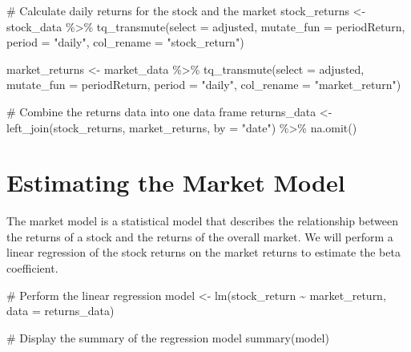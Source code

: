 \documentclass[
]{scrartcl}
\newenvironment{Shaded}{\begin{snugshade}}{\end{snugshade}}
\newcommand{\AttributeTok}[1]{\textcolor[rgb]{0.40,0.45,0.13}{#1}}
\newcommand{\CommentTok}[1]{\textcolor[rgb]{0.37,0.37,0.37}{#1}}
\newcommand{\FunctionTok}[1]{\textcolor[rgb]{0.28,0.35,0.67}{#1}}
\newcommand{\NormalTok}[1]{\textcolor[rgb]{0.00,0.23,0.31}{#1}}
\newcommand{\OtherTok}[1]{\textcolor[rgb]{0.00,0.23,0.31}{#1}}
\newcommand{\SpecialCharTok}[1]{\textcolor[rgb]{0.37,0.37,0.37}{#1}}
\newcommand{\StringTok}[1]{\textcolor[rgb]{0.13,0.47,0.30}{#1}}
\begin{document}
\begin{Shaded}
\begin{Highlighting}[]
\CommentTok{\# Calculate daily returns for the stock and the market}
\NormalTok{stock\_returns }\OtherTok{\textless{}{-}}\NormalTok{ stock\_data }\SpecialCharTok{\%\textgreater{}\%}
  \FunctionTok{tq\_transmute}\NormalTok{(}\AttributeTok{select =}\NormalTok{ adjusted, }
               \AttributeTok{mutate\_fun =}\NormalTok{ periodReturn, }
               \AttributeTok{period =} \StringTok{"daily"}\NormalTok{, }
               \AttributeTok{col\_rename =} \StringTok{"stock\_return"}\NormalTok{)}

\NormalTok{market\_returns }\OtherTok{\textless{}{-}}\NormalTok{ market\_data }\SpecialCharTok{\%\textgreater{}\%}
  \FunctionTok{tq\_transmute}\NormalTok{(}\AttributeTok{select =}\NormalTok{ adjusted, }
               \AttributeTok{mutate\_fun =}\NormalTok{ periodReturn, }
               \AttributeTok{period =} \StringTok{"daily"}\NormalTok{, }
               \AttributeTok{col\_rename =} \StringTok{"market\_return"}\NormalTok{)}

\CommentTok{\# Combine the returns data into one data frame}
\NormalTok{returns\_data }\OtherTok{\textless{}{-}} \FunctionTok{left\_join}\NormalTok{(stock\_returns, }
\NormalTok{                          market\_returns, }
                          \AttributeTok{by =} \StringTok{"date"}\NormalTok{) }\SpecialCharTok{\%\textgreater{}\%}
  \FunctionTok{na.omit}\NormalTok{()}
\end{Highlighting}
\end{Shaded}

\section{Estimating the Market Model}\label{estimating-the-market-model}

The market model is a statistical model that describes the relationship
between the returns of a stock and the returns of the overall market. We
will perform a linear regression of the stock returns on the market
returns to estimate the beta coefficient.

\begin{Shaded}
\begin{Highlighting}[]
\CommentTok{\# Perform the linear regression}
\NormalTok{model }\OtherTok{\textless{}{-}} \FunctionTok{lm}\NormalTok{(stock\_return }\SpecialCharTok{\textasciitilde{}}\NormalTok{ market\_return, }\AttributeTok{data =}\NormalTok{ returns\_data)}

\CommentTok{\# Display the summary of the regression model}
\FunctionTok{summary}\NormalTok{(model)}
\end{Highlighting}
\end{Shaded}
\end{document}
